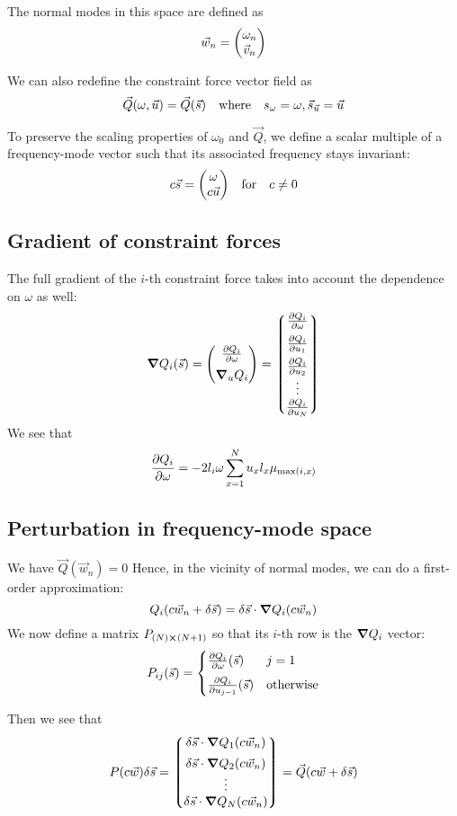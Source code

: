 \documentclass[12pt]{article}
\begin{document}
	The normal modes in this space are defined as
	$$\vec{w}_n=\mqty(\omega_n \\ \vec{v}_n)$$
	
	We can also redefine the constraint force vector field as
	$$\vec{Q}(\omega, \vec{u})=\vec{Q}(\vec{s})\qq{where}s_\omega = \omega, \vec{s}_{\vec{u}}=\vec{u}$$
	
	To preserve the scaling properties of $\omega_0$ and $\vec{Q}$, we define a scalar multiple of a frequency-mode vector such that its associated frequency stays invariant:
	$$c\vec{s}=\mqty(\omega \\ c\vec{u})\qq{for}c\neq 0$$
	
	\subsection{Gradient of constraint forces}
	The full gradient of the $i$-th constraint force takes into account the dependence on $\omega$ as well:
	$$\grad Q_i(\vec{s})=\mqty(\pdv{Q_i}{\omega} \\[5pt] \grad_u Q_i)=\mqty*(\pdv{Q_i}{\omega} \\[5pt] \pdv{Q_i}{u_1} \\[5pt] \pdv{Q_i}{u_2} \\ \vdots \\ \pdv{Q_i}{u_N})$$
	We see that
	$$\pdv{Q_i}{\omega} = -2l_i \omega \sum_{x=1}^N  u_x l_x \mu_{\max(i,x)}$$
	
	\subsection{Perturbation in frequency-mode space}
	We have
	$\vec{Q}(\vec{w}_n)=0$
	Hence, in the vicinity of normal modes, we can do a first-order approximation:
	$$Q_i(c\vec{w}_n + \delta \vec{s})=\delta \vec{s}\cdot \grad Q_i(c\vec{w}_n)$$
	We now define a matrix $P_{(N)\cross (N+1)}$ so that its $i$-th row is the $\grad Q_i$ vector:
	$$P_{ij}(\vec{s})=\begin{cases}
   
    \pdv{Q_i}{\omega}()(\vec{s}) & j = 1 \\[5pt]
     
    \pdv{Q_i}{u_{j-1}}()(\vec{s}) & \mbox{otherwise}
   
  \end{cases}$$
  
  Then we see that
  $$P(c\vec{w})\delta\vec{s} = \mqty*(\delta \vec{s}\cdot \grad Q_1(c\vec{w}_n) \\[5pt] \delta \vec{s}\cdot \grad Q_2(c\vec{w}_n) \\ \vdots \\ \delta \vec{s}\cdot \grad Q_N(c\vec{w}_n))=\vec{Q}(c\vec{w}+\delta\vec{s})$$
  
\end{document}

